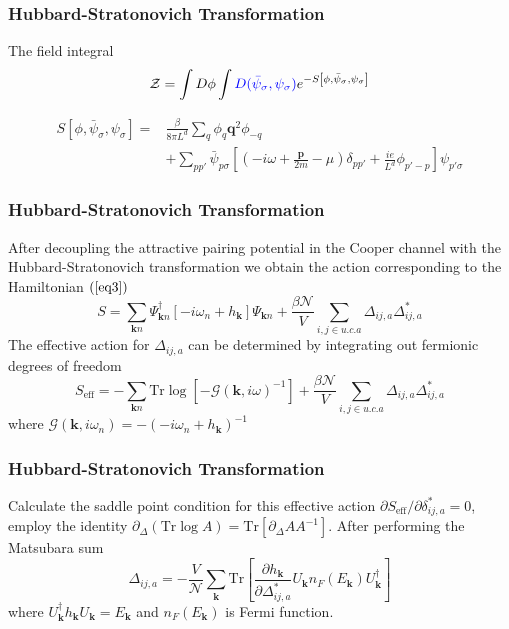 \documentclass{beamer}
\begin{document}
\begin{frame}
\frametitle{Hubbard-Stratonovich Transformation}
The field integral 
\begin{equation}
\mathcal{Z}=\int D\phi\int \textcolor{blue}{D(\bar{\psi}_\sigma,\psi_\sigma)}e^{-S\left[\phi,\bar{\psi}_\sigma,\psi_\sigma\right]}
\end{equation}

\begin{equation}
\begin{aligned}
S\left[\phi,\bar{\psi}_\sigma,\psi_\sigma\right]=&\frac{\beta}{8\pi L^d}\sum_q\phi_q\mathbf{q}^2\phi_{-q}\\
&+\sum_{pp'}\bar{\psi}_{p\sigma}\left[(-i\omega+\frac{\mathbf{p}}{2m}-\mu)\delta_{pp'}+\frac{ie}{L^d}\phi_{p'-p}\right]\psi_{p'\sigma}
\end{aligned}
\end{equation}
\end{frame}
\begin{frame}
\frametitle{Hubbard-Stratonovich Transformation}
After decoupling the attractive pairing potential in the
Cooper channel with the Hubbard-Stratonovich transformation we obtain the action corresponding to the Hamiltonian $(\ref{eq3})$
\begin{equation}
S=\sum_{\mathbf{k}n}\Psi^\dagger_{\mathbf{k}n}\left[-i\omega_n+h_\mathbf{k}\right]\Psi_{\mathbf{k}n}+\frac{\beta \mathcal{N}}{V}\sum_{i,j\in u.c.a}\Delta_{ij,a}\Delta^*_{ij,a}
\end{equation}
The effective action for $\Delta_{ij,a}$ can be determined by integrating out fermionic degrees of freedom 
\begin{equation}
S_{\mathrm{eff}}=-\sum_{\mathbf{k}n}\mathrm{Tr}\log\left[-\mathcal{G}(\mathbf{k},i\omega)^{-1}\right]+\frac{\beta \mathcal{N}}{V}\sum_{i,j\in u.c.a}\Delta_{ij,a}\Delta^*_{ij,a}
\end{equation}
where $\mathcal{G}(\mathbf{k},i\omega_n)=-(-i\omega_n+h_\mathbf{k})^{-1}$
\end{frame}
\begin{frame}
\frametitle{Hubbard-Stratonovich Transformation}
Calculate the saddle point condition for this effective action $\partial S_{\mathrm{eff}}/\partial\delta^*_{ij,a}=0$, employ the identity $\partial_\Delta(\mathrm{Tr}\log A)=\mathrm{Tr}\left[\partial_\Delta AA^{-1}  \right]$. After performing the Matsubara sum
\begin{equation}
\Delta_{ij,a}=-\frac{V}{\mathcal{N}}\sum_\mathbf{k}\mathrm{Tr}\left[\frac{\partial h_\mathbf{k}}{\partial \Delta^*_{ij,a}}U_\mathbf{k}n_F(E_\mathbf{k})U^\dagger_\mathbf{k}\right]
\end{equation}
where $U^\dagger_\mathbf{k}h_\mathbf{k}U_\mathbf{k}=E_\mathbf{k}$ and $n_F(E_\mathbf{k})$ is Fermi function.
\end{frame}
\end{document}
